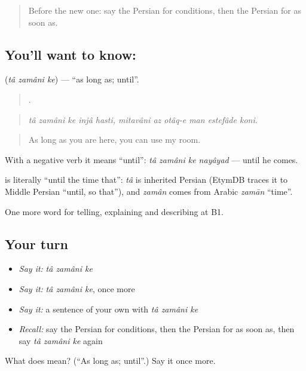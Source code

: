 \begin{quote}
Before the new one: say the Persian for conditions, then the Persian for as soon as.
\end{quote}

\subsection*{You'll want to know:   }
\textbf{  } (\emph{tâ zamâni ke}) — \textquotedblleft{}as long as; until\textquotedblright{}.

\begin{quote}
          .
\end{quote}

\begin{quote}
\emph{tâ zamâni ke injâ hasti, mitavâni az otâq-e man estefâde koni.}
\end{quote}

\begin{quote}
As long as you are here, you can use my room.
\end{quote}

With a negative verb it means \textquotedblleft{}until\textquotedblright{}: \emph{tâ zamâni ke nayâyad} — until he comes.

\begin{cousinweb}
\textbf{  } is literally \textquotedblleft{}until the time that\textquotedblright{}: \emph{tâ} is inherited Persian (EtymDB traces it to Middle Persian \textquotedblleft{}until, so that\textquotedblright{}), and \emph{zamân} comes from Arabic \emph{zamān} \textquotedblleft{}time\textquotedblright{}.
\end{cousinweb}

\begin{grammarlens}[title={What you've built}]
One more word for telling, explaining and describing at B1.
\end{grammarlens}

\subsection*{Your turn}
\begin{itemize}
\raggedright
  \item \emph{Say it:} \emph{tâ zamâni ke}
  \item \emph{Say it:} \emph{tâ zamâni ke}, once more
  \item \emph{Say it:} a sentence of your own with \emph{tâ zamâni ke}
  \item \emph{Recall:} say the Persian for conditions, then the Persian for as soon as, then say \emph{tâ zamâni ke} again
\end{itemize}

\begin{tcolorbox}[breakable,colback=teal!4,colframe=teal!35!black,title={Before you move on}]
What does    mean? (\textquotedblleft{}As long as; until\textquotedblright{}.) Say it once more.
\end{tcolorbox}
